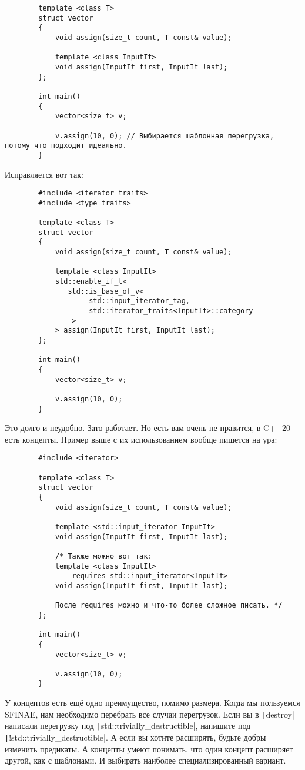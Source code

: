 \documentclass{article}
\begin{document}
    \begin{verbatim}
        template <class T>
        struct vector
        {
            void assign(size_t count, T const& value);
            
            template <class InputIt>
            void assign(InputIt first, InputIt last);
        };

        int main()
        {
            vector<size_t> v;
            
            v.assign(10, 0); // Выбирается шаблонная перегрузка, потому что подходит идеально.
        }
    \end{verbatim}
    Исправляется вот так:
    \begin{verbatim}
        #include <iterator_traits>
        #include <type_traits>

        template <class T>
        struct vector
        {
            void assign(size_t count, T const& value);

            template <class InputIt>
            std::enable_if_t<
               std::is_base_of_v<
                    std::input_iterator_tag,
                    std::iterator_traits<InputIt>::category
                >
            > assign(InputIt first, InputIt last);
        };

        int main()
        {
            vector<size_t> v;
            
            v.assign(10, 0);
        }
    \end{verbatim}
    Это долго и неудобно. Зато работает. Но есть вам очень не нравится, в C++20 есть концепты. Пример выше с их использованием вообще пишется на ура:
    \begin{verbatim}
        #include <iterator>

        template <class T>
        struct vector
        {
            void assign(size_t count, T const& value);
            
            template <std::input_iterator InputIt>
            void assign(InputIt first, InputIt last);

            /* Также можно вот так:
            template <class InputIt>
                requires std::input_iterator<InputIt>
            void assign(InputIt first, InputIt last);

            После requires можно и что-то более сложное писать. */
        };

        int main()
        {
            vector<size_t> v;
            
            v.assign(10, 0);
        }
    \end{verbatim}
    У концептов есть ещё одно преимущество, помимо размера. Когда мы пользуемся SFINAE, нам необходимо перебрать все случаи перегрузок. Если вы в \texttt|destroy| написали перегрузку под \texttt|std::trivially_destructible|, напишите под \texttt|!std::trivially_destructible|. А если вы хотите расширять, будьте добры изменить предикаты. А концепты умеют понимать, что один концепт расширяет другой, как с шаблонами. И выбирать наиболее специализированный вариант.
\end{document}

